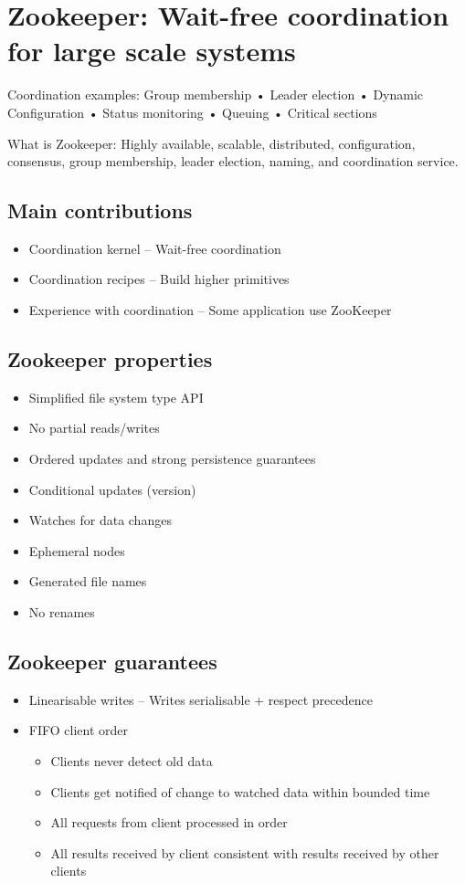 \chapter{Zookeeper: Wait-free coordination for large scale systems}

Coordination examples: Group membership • Leader election • Dynamic Configuration • Status monitoring • Queuing • Critical sections 

What is Zookeeper: Highly available, scalable, distributed, configuration, consensus, group membership, leader election, naming, and coordination service.

\section{Main contributions}
\begin{itemize}
    \item Coordination kernel – Wait-free coordination
    \item Coordination recipes – Build higher primitives
    \item Experience with coordination – Some application use ZooKeeper
\end{itemize}

\section{Zookeeper properties}
\begin{itemize}
    \item Simplified file system type API 
    \item No partial reads/writes
    \item Ordered updates and strong persistence guarantees
    \item Conditional updates (version)
    \item Watches for data changes
    \item Ephemeral nodes
    \item Generated file names
    \item No renames 
\end{itemize}
    
\section{Zookeeper guarantees}
\begin{itemize}
    \item Linearisable writes – Writes serialisable + respect precedence
    \item FIFO client order 
    \begin{itemize}
        \item Clients never detect old data
        \item Clients get notified of change to watched data within bounded time
        \item All requests from client processed in order
        \item All results received by client consistent with results received by other clients
    \end{itemize}
\end{itemize}

